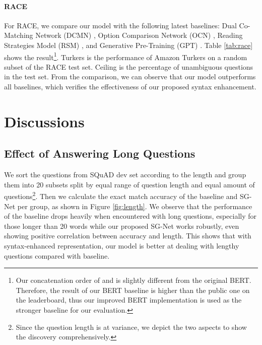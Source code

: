 \documentclass[letterpaper]{article} \usepackage{color}
\begin{document}
\paragraph{RACE} For RACE, we compare our model with the following latest baselines: Dual Co-Matching Network (DCMN) \cite{zhang2019dual}, Option Comparison Network (OCN) \cite{ran2019option}, Reading Strategies Model (RSM) \cite{sun2018improving}, and Generative Pre-Training (GPT) \cite{radford2018improving}. Table \ref{tab:race} shows the result\footnote{Our concatenation order of  and  is slightly different from the original BERT. Therefore, the result of our BERT baseline is higher than the public one on the leaderboard, thus our improved BERT implementation is used as the stronger baseline for our evaluation.}. Turkers is the performance of Amazon Turkers on a random subset of the RACE test set. Ceiling is the percentage of unambiguous questions in the test set. From the comparison, we can observe that our model outperforms all baselines, which verifies the effectiveness of our proposed syntax enhancement.



\section{Discussions}

\subsection{Effect of Answering Long Questions}
\label{sec:long}
We sort the questions from SQuAD dev set according to the length and group them into 20 subsets split by equal range of question length and equal amount of questions\footnote{Since the question length is at variance, we depict the two aspects to show the discovery comprehensively.}. Then we calculate the exact match accuracy of the baseline and SG-Net per group, as shown in Figure \ref{fig:length}. We observe that the performance of the baseline drops heavily when encountered with long questions, especially for those longer than 20 words while our proposed SG-Net works robustly, even showing positive correlation between accuracy and length. This shows that with syntax-enhanced representation, our model is better at dealing with lengthy questions compared with baseline.
\end{document}
